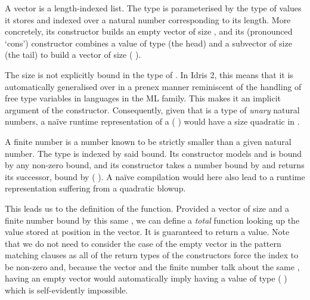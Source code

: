 \documentclass{article}
\newcommand{\idris}{Idris 2}
\begin{document}
A vector is a length-indexed list. The type  is parameterised
by the type of values it stores and indexed over a natural number corresponding
to its length.
%
More concretely, its  constructor builds an empty vector of size
, and its \IdrisData{(::)} (pronounced `cons') constructor combines a
value of type  (the head) and a subvector of size 
(the tail) to build a vector of size ( \IdrisFunction{+} ).


The size  is not explicitly bound in the type of \IdrisData{(::)}.
In \idris{}, this means that it is automatically generalised over in a prenex
manner reminiscent of the handling of free type variables in languages in the
ML family.
%
This makes it an implicit argument of the constructor. Consequently, given that
 is a type of \emph{unary} natural numbers, a naïve runtime
representation of a {(  )} would
have a size quadratic in .

A finite number is a number known to be strictly smaller than a given natural
number. The type  is indexed by said bound.
%
Its  constructor models  and is bound by any
non-zero bound, and its  constructor takes a number bound by
 and returns its successor, bound by
( \IdrisFunction{+} ).
%
A naïve compilation would here also lead to a runtime representation suffering
from a quadratic blowup.


This leads us to the definition of the  function.
%
Provided a vector of size  and a finite number  bound
by this same , we can define a \emph{total} function looking up the
value stored at position  in the vector.
%
It is guaranteed to return a value.
%
Note that we do not need to consider the case of the empty vector in the pattern
matching clauses as all of the return types of the  constructors force
the index to be non-zero and, because the vector and the finite number talk about the
same , having an empty vector would automatically imply having a value
of type ( ) which is self-evidently impossible.

\end{document}

